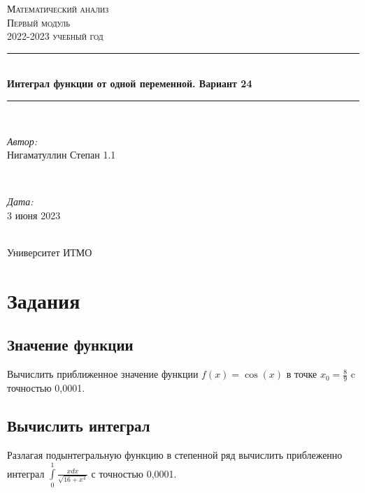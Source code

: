 \documentclass[fleqn]{article}
\begin{document}
\begin{titlepage}
    \centering
    \vspace*{0.5 cm}
    \textsc{\LARGE Математический анализ}\\[1.0 cm]
    \textsc{\Large Первый модуль}\\[0.5 cm]
    \textsc{\large 2022-2023 учебный год}\\[1.5 cm]
    \rule{\linewidth}{0.1 mm} \\[0.4 cm]
    { \huge \bfseries Интеграл функции от одной переменной. Вариант 24}\\[0.2 cm]
    \rule{\linewidth}{0.1 mm} \\[2 cm]
    \begin{minipage}{0.6\textwidth}
        \begin{flushleft} \large
            \emph{Автор:}\\
            Нигаматуллин Степан 1.1
        \end{flushleft}
    \end{minipage}~
    \begin{minipage}{0.4\textwidth}
        \begin{flushright} \large
            \emph{Дата:} \\
            3 июня 2023
        \end{flushright}
    \end{minipage}\\[2 cm]
    {\large Университет ИТМО}\\[2 cm]
    \vfill
\end{titlepage}

\renewcommand{\contentsname}{Содержимое}
\tableofcontents
\newpage


\section{Задания}

\subsection{Значение функции}

Вычислить приближенное значение функции $f(x) = \cos(x)$ в точке $x_0 = \frac{8}{9}$ c точностью 0,0001.

\subsection{Вычислить интеграл}

Разлагая подынтегральную функцию в степенной ряд вычислить приблеженно интеграл $\int\limits_{0}^{1} \frac{xdx}{\sqrt{16+x^4}}$ с точностью 0,0001.
\end{document}
